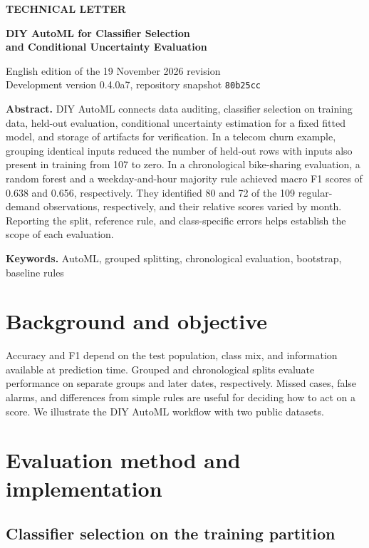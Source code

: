 \documentclass[10pt,a4paper]{article}
\begin{document}
{\small\bfseries TECHNICAL LETTER\par}
\vspace{5pt}
{\LARGE\bfseries DIY AutoML for Classifier Selection\\
and Conditional Uncertainty Evaluation\par}
\vspace{4pt}
{\small English edition of the 19 November 2026 revision\\
Development version 0.4.0a7, repository snapshot \texttt{80b25cc}\par}
\vspace{7pt}

\textbf{Abstract.}
DIY AutoML connects data auditing, classifier selection on training data, held-out evaluation, conditional uncertainty estimation for a fixed fitted model, and storage of artifacts for verification. In a telecom churn example, grouping identical inputs reduced the number of held-out rows with inputs also present in training from 107 to zero. In a chronological bike-sharing evaluation, a random forest and a weekday-and-hour majority rule achieved macro F1 scores of 0.638 and 0.656, respectively. They identified 80 and 72 of the 109 regular-demand observations, respectively, and their relative scores varied by month. Reporting the split, reference rule, and class-specific errors helps establish the scope of each evaluation.

{\small\textbf{Keywords.} AutoML, grouped splitting, chronological evaluation, bootstrap, baseline rules}

\section{Background and objective}

Accuracy and F1 depend on the test population, class mix, and information available at prediction time. Grouped and chronological splits evaluate performance on separate groups and later dates, respectively. Missed cases, false alarms, and differences from simple rules are useful for deciding how to act on a score. We illustrate the DIY AutoML workflow with two public datasets. \cite{audit}

\section{Evaluation method and implementation}

\subsection{Classifier selection on the training partition}
\end{document}

